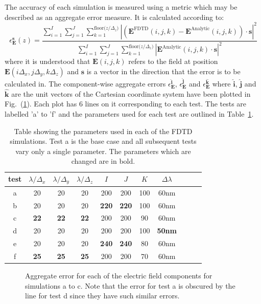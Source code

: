 \documentclass[a4paper, 12pt]{article}
\newcommand{\rfig}[1]{Fig.\ (\ref{#1})}
\newcommand{\tab}[1]{Table\ \ref{#1}}
\begin{document}
	The accuracy of each simulation is measured using a metric which may
	be described as an aggregate error measure. It is calculated according
	to:
	\begin{equation}
		\epsilon_{\mathbf{E}}^{\mathbf{s}}(z)=\frac{\sum\limits_{i=1}^{I}\sum\limits_{j=1}^{J}\sum\limits_{k=1}^{\textrm{floor(}z/\Delta_z\textrm{)}}\left|\left(\mathbf{E}^{\textrm{FDTD}}(i,j,k)-\mathbf{E}^{\textrm{Analytic}}(i,j,k)\right)\!\cdot\!\mathbf{s}\right|^2}{\sum\limits_{i=1}^{I}\sum\limits_{j=1}^{J}\sum\limits_{k=1}^{\textrm{floor(}z/\Delta_z\textrm{)}}\left|\mathbf{E}^{\textrm{Analytic}}(i,j,k)\!\cdot\!\mathbf{s}\right|^2}
		\label{eq:fdtd:aggerr}
	\end{equation}
	where it is understood that $\mathbf{E}(i,j,k)$ refers to the field at
	position $\mathbf{E}(i\Delta_x,j\Delta_y,k\Delta_z)$ and $\mathbf{s}$
	is a vector in the direction that the error is to be calculated
	in. The component-wise aggregate errors
	$\epsilon_{\mathbf{E}}^{\hat{\mathbf{i}}}$,
	$\epsilon_{\mathbf{E}}^{\hat{\mathbf{j}}}$ and
	$\epsilon_{\mathbf{E}}^{\hat{\mathbf{k}}}$ where $\hat{\mathbf{i}}$,
	$\hat{\mathbf{j}}$ and $\hat{\mathbf{k}}$ are the unit vectors of the
	Cartesian coordinate system have been plotted in
	\rfig{fig:fdtd:fdtd_rw}. Each plot has 6 lines on it corresponding to
	each test. The tests are labelled 'a' to 'f' and the parameters used
	for each test are outlined in \tab{tab:fdtd:sims}. 
	\begin{table}[!h]
		\begin{center}
			\begin{tabular}{|c|c|c|c|c|c|c|c|c|c|c|}
				\hline
				test&$\lambda/\Delta_x$&$\lambda/\Delta_y$&$\lambda/\Delta_z$&$I$&$J$&$K$&$\Delta \lambda$\\
				\hline
				a&20&20&20&200&200&100&60nm\\
				\hline
				b&20&20&20&\bf{220}&\bf{220}&100&60nm\\
				\hline
				c&\bf{22}&\bf{22}&\bf{22}&200&200&90&60nm\\
				\hline
				d&20&20&20&200&200&100&\bf{50nm}\\
				\hline
				e&20&20&20&\bf{240}&\bf{240}&80&60nm\\
				\hline
				f&\bf{25}&\bf{25}&\bf{25}&200&200&70&60nm\\
				\hline
			\end{tabular}
		\end{center}
		\caption{Table showing the parameters used in each of the FDTD
			simulations. Test a is the base case and all subsequent tests vary
			only a single parameter. The parameters which are changed are
			in bold.}
		\label{tab:fdtd:sims}
	\end{table}
	\begin{figure}[!h]
		\centering
		\caption{Aggregate error for each of the electric field components
			for simulations a to c. Note that the error for test a is obscured
			by the line for test d since they have such similar errors.}
		\label{fig:fdtd:fdtd_rw}
	\end{figure}
	
\end{document}
